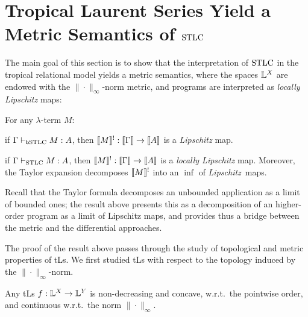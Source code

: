 \documentclass[submission,%
]{eptcs}
\begin{document}
\section{Tropical Laurent Series Yield a Metric Semantics of $\mathrm{STLC}$}

The main goal of this section is to show that the interpretation of $\mathrm{STLC}$ in the tropical relational model yields a metric semantics, where the spaces $\mathbb{L}^{X}$ are endowed with the $\|\cdot\|_{\infty}$-norm metric, and programs are interpreted as \emph{locally Lipschitz} maps:
\begin{theorem}\label{cor:main}
For any $\lambda$-term $M$:
\begin{varenumerate}
\item if $\Gamma \vdash_{\mathsf b\mathrm{STLC}} M:A$, then $\llbracket M\rrbracket^!:\llbracket\Gamma\rrbracket \to \llbracket A\rrbracket$ is a \emph{Lipschitz} map.
\item if $\Gamma \vdash_{\mathrm{STLC}}M:A$, then $\llbracket M\rrbracket^!: \llbracket\Gamma\rrbracket \to \llbracket A\rrbracket$ is a \emph{locally Lipschitz} map. Moreover, the Taylor expansion decomposes $\llbracket M\rrbracket^!$ into an $\inf$ of \emph{Lipschitz}~maps.
\end{varenumerate}
\end{theorem}
Recall that the Taylor formula decomposes an unbounded application as a limit of bounded ones; the result above presents this as a decomposition of an higher-order program as a limit of Lipschitz maps, and provides thus a bridge between the metric and the differential approaches.

 
The proof of the result above passes through the study of topological and metric properties of tLs. 
We first studied tLs with respect to the topology induced by the $\|\cdot\|_{\infty}$-norm.
%
 
% 
%





\begin{proposition}\label{prop:nondecr+conc}
 Any tLs $f:\mathbb{L}^X\to\mathbb{L}^Y$ is non-decreasing and concave, w.r.t.\ the pointwise order, and continuous w.r.t.~the norm $\|\cdot\|_{\infty}$.
\end{proposition}
\end{document}
